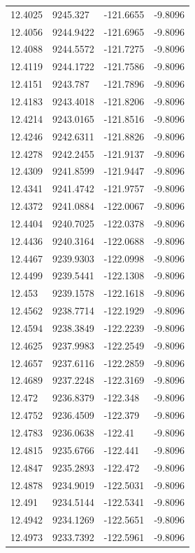 \begin{table}[H]
\begin{tabular}{llll}
12.4025 & 9245.327 & -121.6655 & -9.8096 \\
12.4056 & 9244.9422 & -121.6965 & -9.8096 \\
12.4088 & 9244.5572 & -121.7275 & -9.8096 \\
12.4119 & 9244.1722 & -121.7586 & -9.8096 \\
12.4151 & 9243.787 & -121.7896 & -9.8096 \\
12.4183 & 9243.4018 & -121.8206 & -9.8096 \\
12.4214 & 9243.0165 & -121.8516 & -9.8096 \\
12.4246 & 9242.6311 & -121.8826 & -9.8096 \\
12.4278 & 9242.2455 & -121.9137 & -9.8096 \\
12.4309 & 9241.8599 & -121.9447 & -9.8096 \\
12.4341 & 9241.4742 & -121.9757 & -9.8096 \\
12.4372 & 9241.0884 & -122.0067 & -9.8096 \\
12.4404 & 9240.7025 & -122.0378 & -9.8096 \\
12.4436 & 9240.3164 & -122.0688 & -9.8096 \\
12.4467 & 9239.9303 & -122.0998 & -9.8096 \\
12.4499 & 9239.5441 & -122.1308 & -9.8096 \\
12.453 & 9239.1578 & -122.1618 & -9.8096 \\
12.4562 & 9238.7714 & -122.1929 & -9.8096 \\
12.4594 & 9238.3849 & -122.2239 & -9.8096 \\
12.4625 & 9237.9983 & -122.2549 & -9.8096 \\
12.4657 & 9237.6116 & -122.2859 & -9.8096 \\
12.4689 & 9237.2248 & -122.3169 & -9.8096 \\
12.472 & 9236.8379 & -122.348 & -9.8096 \\
12.4752 & 9236.4509 & -122.379 & -9.8096 \\
12.4783 & 9236.0638 & -122.41 & -9.8096 \\
12.4815 & 9235.6766 & -122.441 & -9.8096 \\
12.4847 & 9235.2893 & -122.472 & -9.8096 \\
12.4878 & 9234.9019 & -122.5031 & -9.8096 \\
12.491 & 9234.5144 & -122.5341 & -9.8096 \\
12.4942 & 9234.1269 & -122.5651 & -9.8096 \\
12.4973 & 9233.7392 & -122.5961 & -9.8096 \\

\end{tabular}
\end{table}
